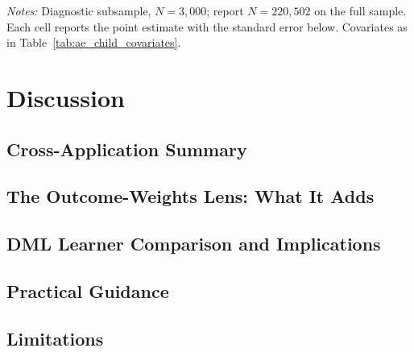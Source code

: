 \documentclass[12pt, a4paper, oneside]{article}
\theoremstyle{plain}
\theoremstyle{definition}
\begin{document}
\begin{table}[H]
\vspace{4pt}
\parbox{0.95\textwidth}{\footnotesize \textit{Notes:} Diagnostic subsample, $N=3{,}000$; \citet{sloczynski2025abadie} report $N=220{,}502$ on the full sample. Each cell reports the point estimate with the standard error below. Covariates as in Table~\ref{tab:ae_child_covariates}.}
\end{table}

\section{Discussion}
\label{sec:discussion}

\subsection{Cross-Application Summary}
\label{subsec:cross_application}



\subsection{The Outcome-Weights Lens: What It Adds}
\label{subsec:lens}


\subsection{DML Learner Comparison and Implications}



\subsection{Practical Guidance}
\label{subsec:practical}


\subsection{Limitations}
\label{subsec:limitations}

\end{document}
